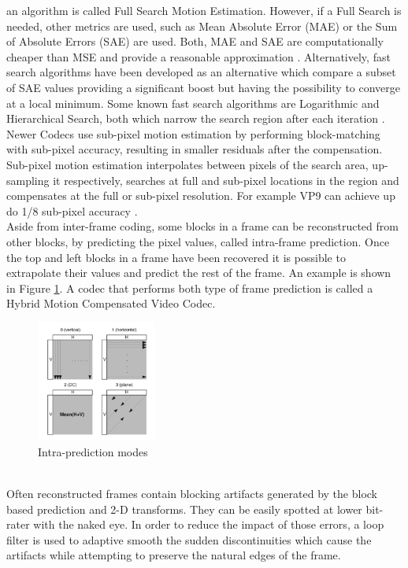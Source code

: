 \documentclass[a4paper,11pt,oneside]{article}
\begin{document}
an algorithm is called Full Search Motion Estimation. However, if a Full Search is needed, other metrics are used, such as Mean Absolute Error
(MAE) or the Sum of Absolute Errors (SAE) are used. Both, MAE and SAE are computationally cheaper than MSE and provide a reasonable
approximation \cite[pp.~99]{richardson2002video}. Alternatively, fast search algorithms have been developed as an alternative which compare a
subset of SAE values providing a significant boost but having the possibility to converge at a local minimum. Some known fast search algorithms
are Logarithmic and Hierarchical Search, both which narrow the search region after each iteration \cite{vsp_coursera}. 
Newer Codecs use sub-pixel motion estimation by performing block-matching with sub-pixel accuracy, resulting in smaller residuals after the compensation. Sub-pixel motion estimation interpolates between pixels of the search area, up-sampling it respectively, searches at full and sub-pixel locations in the region and compensates at the full or sub-pixel resolution. For example VP9 can achieve up do 1/8 sub-pixel accuracy \cite[pp.~29]{vp9_bitstream}. \\
\indent Aside from inter-frame coding, some blocks in a frame can be reconstructed from other blocks, by predicting the pixel values, called  intra-frame prediction. Once the top and left blocks in a frame have been recovered it is possible to extrapolate their values and predict the rest of the frame. An example is shown in Figure \ref{figure:intra-coding}. A codec that performs both type of frame prediction is called a Hybrid Motion Compensated Video Codec. 
\begin{figure}[h]
    \centering
    \includegraphics[width=0.35\textwidth]{../figures/intra-coding.pdf}
    \caption{Intra-prediction modes \cite[pp.381]{intra_codec_papaer}}
    \label{figure:intra-coding}
\end{figure} \\
\indent Often reconstructed frames contain blocking artifacts generated by the block based prediction and 2-D transforms. They can be easily spotted at lower bit-rater with the naked eye. In order to reduce the impact of those errors, a loop filter is used to adaptive smooth the sudden discontinuities which cause the artifacts while attempting to preserve the natural edges of the frame.\\ 
\end{document}
